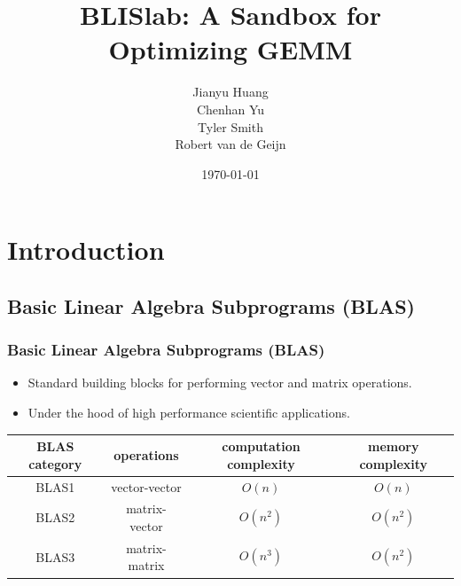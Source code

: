 \documentclass[xcolor=pdflatex,dvipsnames,table]{beamer}
\title{BLISlab: A Sandbox for Optimizing GEMM}
\author[Jianyu et al]{Jianyu Huang\\Chenhan Yu\\Tyler Smith\\Robert van de Geijn}
\date{\today}
\institute[UT Austin]{SHPC UT Austin\\http://shpc.ices.utexas.edu/}
\begin{document}
\begin{frame}
\titlepage
\end{frame}

\section{Introduction}

\subsection{Basic Linear Algebra Subprograms (BLAS)}
\begin{frame}[fragile]
\frametitle{Basic Linear Algebra Subprograms (BLAS)}

\begin{itemize}
\item Standard building blocks for performing vector and matrix operations.
\item Under the hood of high performance scientific applications.
\end{itemize}

 \vskip5mm

{\footnotesize
\centering
{
  \begin{tabular}{c|c|c|c}
  \hline
BLAS category & operations & computation complexity & memory complexity \\
  \hline
BLAS1 & vector-vector & $O(n)$ & $ O(n)$ \\
BLAS2 & matrix-vector & $O(n^2)$ & $O(n^2)$ \\
{\color{red} BLAS3} & matrix-matrix & $O(n^3)$ & $O(n^2)$ \\
  \hline
\end{tabular}
}

}

\end{frame}
\end{document}
